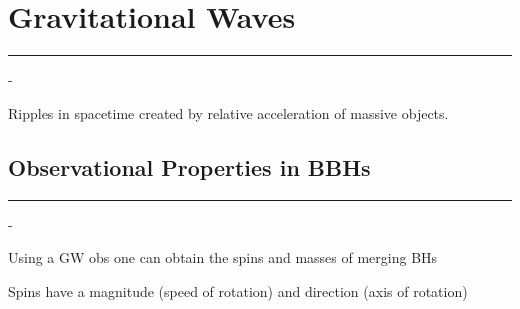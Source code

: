 \pagebreak
\section{Gravitational Waves}
\label{sec:Gravitational-Waves}
\hrule
\vspace{.5cm}

\begin{list}{-}{}
\item Ripples in spacetime created by relative acceleration of massive objects. 
\end{list}

\subsection{Observational Properties in BBHs}
\hrule
\vspace{.5cm}
\begin{list}{-}{}
\item Using a GW obs one can obtain the spins and masses of merging BHs
\item Spins have a magnitude (speed of rotation) and direction (axis of rotation)
\end{list}